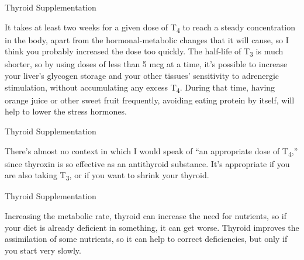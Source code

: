 \documentclass[11pt,oneside,openany,extrafontsizes]{memoir}
\begin{document}
\begin{standalonequote}{Thyroid Supplementation}

    \begin{answer}   
It takes at least two weeks for a given dose of T\textsubscript{4} to reach a steady concentration in the body, apart from the hormonal-metabolic changes that it will cause, so I think you probably increased the dose too quickly. The half-life of T\textsubscript{3} is much shorter, so by using doses of less than 5 mcg at a time, it's possible to increase your liver's glycogen storage and your other tissues' sensitivity to adrenergic stimulation, without accumulating any excess T\textsubscript{4}. During that time, having orange juice or other sweet fruit frequently, avoiding eating protein by itself, will help to lower the stress hormones.
    \end{answer}
\end{standalonequote}

\begin{standalonequote}{Thyroid Supplementation}

    \begin{answer}
      There's almost no context in which I would speak of \enquote{an appropriate dose of T\textsubscript{4},} since thyroxin is so effective as an antithyroid substance. It's appropriate if you are also taking T\textsubscript{3}, or if you want to shrink your thyroid.
    \end{answer}
\end{standalonequote}

\begin{standalonequote}{Thyroid Supplementation}

    \begin{answer}
      Increasing the metabolic rate, thyroid can increase the need for nutrients, so if your diet is already deficient in something, it can get worse. Thyroid improves the assimilation of some nutrients, so it can help to correct deficiencies, but only if you start very slowly.
    \end{answer}
\end{standalonequote}
\end{document}
